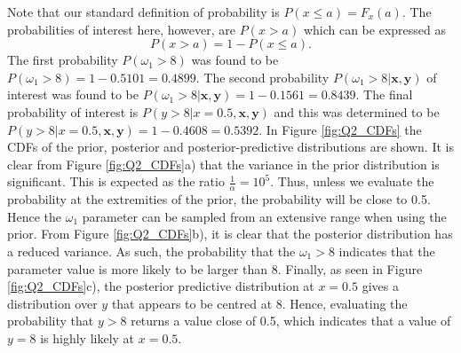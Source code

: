 \documentclass{article}
\begin{document}
Note that our standard definition of probability is $P(x \leq a) = F_x(a)$. The probabilities of interest here, however, are $P(x > a)$ which can be expressed as
\begin{equation}
P(x > a) = 1 - P(x \leq a).
\end{equation}
The first probability $P(\omega_1 > 8)$ was found to be $P(\omega_1 > 8) = 1 - 0.5101 = 0.4899$. The second probability $P(\omega_1 > 8 \vert \mathbf{x}, \mathbf{y})$ of interest was found to be $P(\omega_1 > 8 \vert \mathbf{x}, \mathbf{y}) = 1 - 0.1561 = 0.8439$. The final probability of interest is $P(y > 8 \vert x = 0.5, \mathbf{x}, \mathbf{y})$ and this was determined to be $P(y > 8 \vert x = 0.5, \mathbf{x}, \mathbf{y}) = 1 - 0.4608 = 0.5392$. In Figure \ref{fig:Q2_CDFs} the CDFs of the prior, posterior and posterior-predictive distributions are shown. It is clear from Figure \ref{fig:Q2_CDFs}a) that the variance in the prior distribution is significant. This is expected as the ratio $\frac{1}{\alpha} = 10^5$. Thus, unless we evaluate the probability at the extremities of the prior, the probability will be close to 0.5. Hence the $\omega_1$ parameter can be sampled from an extensive range when using the prior. From Figure \ref{fig:Q2_CDFs}b), it is clear that the posterior distribution has a reduced variance. As such, the probability that the $\omega_1 > 8$ indicates that the parameter value is more likely to be larger than 8. Finally, as seen in Figure \ref{fig:Q2_CDFs}c), the posterior predictive distribution at $x = 0.5$ gives a distribution over $y$ that appears to be centred at 8. Hence, evaluating the probability that $y > 8$ returns a value close of 0.5, which indicates that a value of $y=8$ is highly likely at $x = 0.5$.
\end{document}
